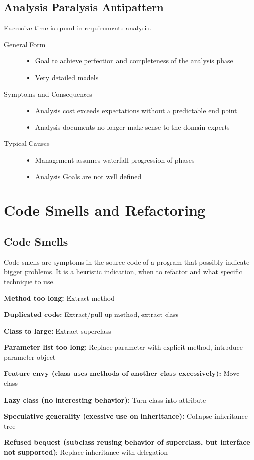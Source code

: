 \subsection{Analysis Paralysis Antipattern}
Excessive time is spend in requirements analysis.
\begin{description}
  \item[General Form] \hfill
  \begin{itemize}
    \item Goal to achieve perfection and completeness of the analysis phase
    \item Very detailed models
  \end{itemize}
  \item[Symptoms and Consequences] \hfill
  \begin{itemize}
    \item Analysis cost exceeds expectations without a predictable end point
    \item Analysis documents no longer make sense to the domain experts
  \end{itemize}
  \item[Typical Causes] \hfill
  \begin{itemize}
    \item Management assumes waterfall progression of phases
    \item Analysis Goals are not well defined
  \end{itemize}
\end{description}
\newpage

\section{Code Smells and Refactoring}
\subsection{Code Smells}
Code smells are symptoms in the source code of a program that possibly indicate bigger problems. It is a heuristic indication, when to refactor and what specific technique to use.
\begin{description}[]
  \item \textbf{Method too long:} Extract method
  \item \textbf{Duplicated code:} Extract/pull up method, extract class
  \item \textbf{Class to large:} Extract superclass
  \item \textbf{Parameter list too long:} Replace parameter with explicit method, introduce parameter object
  \item \textbf{Feature envy (class uses methods of another class excessively):} Move class
  \item \textbf{Lazy class (no interesting behavior):} Turn class into attribute 
  \item \textbf{Speculative generality (exessive use on inheritance):} Collapse inheritance tree
  \item \textbf{Refused bequest (subclass reusing behavior of superclass, but interface not supported)}: Replace inheritance with delegation
\end{description}
\newpage

